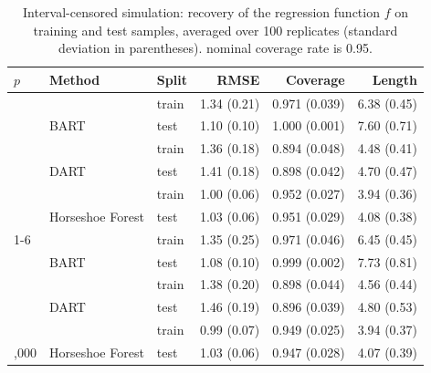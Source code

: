 \begin{table}[!h]
\centering
\caption{\label{tab:sim-ic-table}Interval-censored simulation: recovery of the regression function $f$
       on training and test samples, averaged over 100 replicates (standard
       deviation in parentheses). nominal coverage rate is 0.95.}
\centering
\begin{tabular}[t]{lllrrr}
\toprule
$p$ & Method & Split & RMSE & Coverage & Length\\
\midrule
 &  & train & 1.34 (0.21) & 0.971 (0.039) & 6.38 (0.45)\\

 & \multirow{-2}{*}{\raggedright\arraybackslash BART} & test & 1.10 (0.10) & 1.000 (0.001) & 7.60 (0.71)\\

 &  & train & 1.36 (0.18) & 0.894 (0.048) & 4.48 (0.41)\\

 & \multirow{-2}{*}{\raggedright\arraybackslash DART} & test & 1.41 (0.18) & 0.898 (0.042) & 4.70 (0.47)\\

 &  & train & 1.00 (0.06) & 0.952 (0.027) & 3.94 (0.36)\\

\multirow{-6}{*}[1\dimexpr\aboverulesep+\belowrulesep+\cmidrulewidth]{\raggedright\arraybackslash 500} & \multirow{-2}{*}{\raggedright\arraybackslash Horseshoe Forest} & test & 1.03 (0.06) & 0.951 (0.029) & 4.08 (0.38)\\
\cmidrule{1-6}
 &  & train & 1.35 (0.25) & 0.971 (0.046) & 6.45 (0.45)\\

 & \multirow{-2}{*}{\raggedright\arraybackslash BART} & test & 1.08 (0.10) & 0.999 (0.002) & 7.73 (0.81)\\

 &  & train & 1.38 (0.20) & 0.898 (0.044) & 4.56 (0.44)\\

 & \multirow{-2}{*}{\raggedright\arraybackslash DART} & test & 1.46 (0.19) & 0.896 (0.039) & 4.80 (0.53)\\

 &  & train & 0.99 (0.07) & 0.949 (0.025) & 3.94 (0.37)\\

\multirow{-6}{*}[1\dimexpr\aboverulesep+\belowrulesep+\cmidrulewidth]{\raggedright\arraybackslash 5,000} & \multirow{-2}{*}{\raggedright\arraybackslash Horseshoe Forest} & test & 1.03 (0.06) & 0.947 (0.028) & 4.07 (0.39)\\
\bottomrule
\end{tabular}
\end{table}

